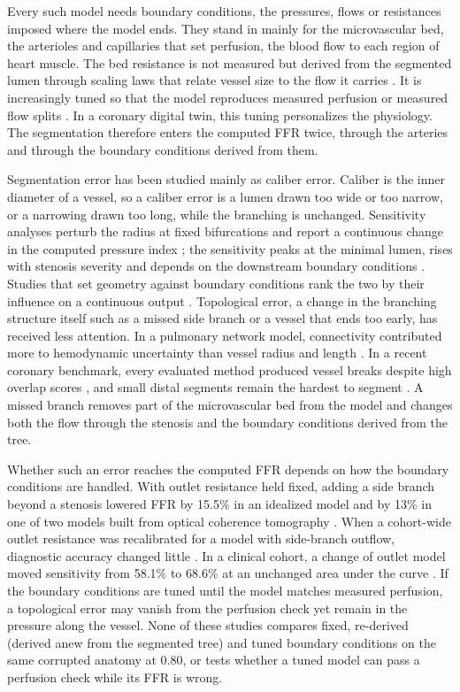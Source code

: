 \documentclass[journal,twoside,web]{ieeecolor}
\begin{document}
Every such model needs boundary conditions, the pressures, flows or resistances imposed where the model ends. They
stand in mainly for the microvascular bed, the arterioles and capillaries that set perfusion, the blood flow to each region of heart
muscle. The bed resistance is not measured but derived from the segmented lumen through
scaling laws that relate vessel size to the flow it carries \cite{murray1926,kim2010}. It is increasingly tuned so that the model reproduces measured perfusion \cite{menon2024} or measured flow splits \cite{arminio2026}. In a coronary digital twin, this tuning personalizes the physiology. The segmentation therefore enters the computed FFR twice, through the arteries and through the boundary conditions derived from them.

Segmentation error has been studied mainly as caliber error. Caliber is the inner diameter of a vessel, so a caliber error is a lumen drawn too wide or too narrow, or a narrowing drawn too long, while the branching is unchanged. Sensitivity analyses perturb the radius at fixed bifurcations and report a continuous change in the computed pressure index \cite{sankaran2015tmi,sankaran2015cmame,fernandez2024,dalmaso2025}; the sensitivity peaks at the minimal lumen, rises with stenosis severity \cite{fernandez2024} and depends on the downstream boundary conditions \cite{sankaran2015tmi}. Studies that set geometry against
boundary conditions rank the two by their influence on a continuous output \cite{sankaran2016,tanade2022,korte2023}. Topological error, a change in the branching structure itself such as a missed side branch or a vessel that ends too early, has received less attention. In a pulmonary network model, connectivity contributed more to hemodynamic uncertainty than vessel radius and
length \cite{colebank2019}. In a recent coronary benchmark, every evaluated method produced vessel breaks despite high overlap scores \cite{bransby2026}, and small distal segments remain the hardest to segment
\cite{chen2025}. A missed branch removes part of the microvascular bed from the model and changes both the flow
through the stenosis and the boundary conditions derived from the tree.

Whether such an error reaches the computed FFR depends on how the boundary conditions are handled. With outlet resistance held fixed, adding a side branch beyond a stenosis lowered FFR by 15.5\% in an idealized model and by 13\% in one of two models built from optical coherence tomography \cite{gamage2022}. When a cohort-wide outlet resistance was recalibrated for a model with side-branch outflow, diagnostic accuracy changed little \cite{gosling2020}. In a clinical cohort, a change of outlet model moved sensitivity from 58.1\% to 68.6\% at an unchanged area under
the curve \cite{fossan2026}. If the boundary conditions are tuned until the model matches measured perfusion, a topological error may vanish
from the perfusion check yet remain in the pressure along the vessel. None of these studies compares fixed, re-derived (derived anew from the segmented tree) and tuned boundary conditions on the same corrupted anatomy at
0.80, or tests whether a tuned model can pass a perfusion check while its FFR is wrong.
\end{document}
